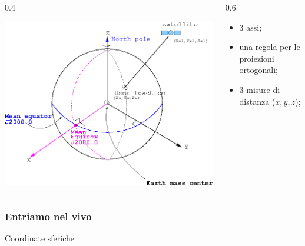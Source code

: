 \documentclass{beamer}
\begin{document}
{\begin{frame}
    \begin{columns}	
          \begin{column} {0.4\textwidth}
          \begin{center}
              \includegraphics[width=\textwidth] {./pics_2022_03/CRS_reference_system.png}	
          \end{center}
          
      \end{column}
      \begin{column} {0.6\textwidth}
         \begin{itemize}
              \item 3 assi;
              \item una regola per le proiezioni ortogonali;
              \item 3 misure di distanza ($x, y, z$);
         \end{itemize}
      \end{column}
  \end{columns}

\end{frame}

\begin{frame}
   \frametitle{Entriamo nel vivo}

   Coordinate sferiche


\end{frame}}
\end{document}
